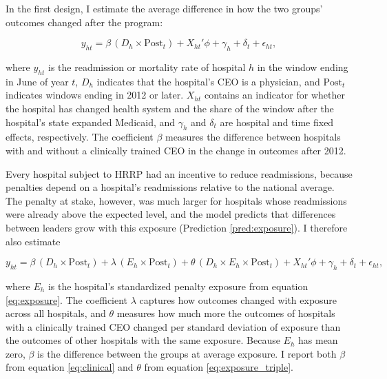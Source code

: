 \documentclass[12pt]{article}
\theoremstyle{definition}   %
\begin{document}
In the first design, I estimate the average difference in how the two groups' outcomes changed after the program:

\begin{equation}
\label{eq:clinical}
y_{ht} = \beta\, (D_h \times \text{Post}_t) + X_{ht}'\phi + \gamma_{h} + \delta_t + \epsilon_{ht},
\end{equation}

\noindent where $y_{ht}$ is the readmission or mortality rate of hospital $h$ in the window ending in June of year $t$, $D_h$ indicates that the hospital's CEO is a physician, and $\text{Post}_t$ indicates windows ending in 2012 or later. $X_{ht}$ contains an indicator for whether the hospital has changed health system and the share of the window after the hospital's state expanded Medicaid, and $\gamma_h$ and $\delta_t$ are hospital and time fixed effects, respectively. The coefficient $\beta$ measures the difference between hospitals with and without a clinically trained CEO in the change in outcomes after 2012.

Every hospital subject to HRRP had an incentive to reduce readmissions, because penalties depend on a hospital's readmissions relative to the national average. The penalty at stake, however, was much larger for hospitals whose readmissions were already above the expected level, and the model predicts that differences between leaders grow with this exposure (Prediction \ref{pred:exposure}). I therefore also estimate

\begin{equation}
\label{eq:exposure_triple}
y_{ht} = \beta\, (D_h \times \text{Post}_t) + \lambda\, (E_h \times \text{Post}_t) + \theta\, (D_h \times E_h \times \text{Post}_t) + X_{ht}'\phi + \gamma_{h} + \delta_t + \epsilon_{ht},
\end{equation}

\noindent where $E_h$ is the hospital's standardized penalty exposure from equation \eqref{eq:exposure}. The coefficient $\lambda$ captures how outcomes changed with exposure across all hospitals, and $\theta$ measures how much more the outcomes of hospitals with a clinically trained CEO changed per standard deviation of exposure than the outcomes of other hospitals with the same exposure. Because $E_h$ has mean zero, $\beta$ is the difference between the groups at average exposure. I report both $\beta$ from equation \eqref{eq:clinical} and $\theta$ from equation \eqref{eq:exposure_triple}.
\end{document}
